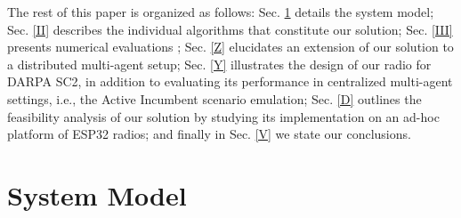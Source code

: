 \documentclass[12pt, draftcls, onecolumn]{IEEEtran}
\newcommand{\add}[1]{{\color{red}{#1}}}
\begin{document}
The rest of this paper is organized as follows: Sec. \ref{I} details the system model; Sec. \ref{II} describes the individual algorithms that constitute our solution; Sec. \ref{III} presents numerical evaluations
\add{for the single-agent case}; Sec. \ref{Z} elucidates an extension of our solution to a distributed multi-agent setup; Sec. \ref{Y} illustrates the design of our radio for DARPA SC2, in addition to evaluating its performance in centralized multi-agent settings, i.e., the Active Incumbent scenario emulation; Sec. \ref{D} outlines the feasibility analysis of our solution by studying its implementation on an ad-hoc platform of ESP32 radios; and finally in Sec. \ref{V} we state our conclusions.

\section{System Model}\label{I}
\end{document}
